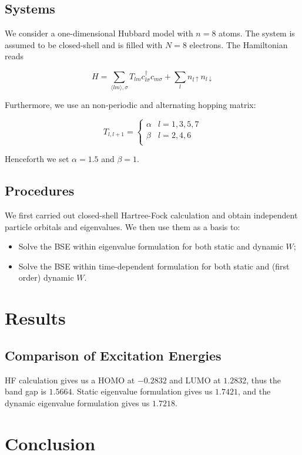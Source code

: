 \documentclass{article}
\begin{document}
\subsection{Systems}
We consider a one-dimensional Hubbard model with $n=8$ atoms. The system is assumed to be closed-shell and is filled with $N=8$ electrons. The Hamiltonian reads

$$
H=\sum_{\langle lm\rangle,\sigma}T_{lm}c_{l\sigma}^{\dagger}c_{m\sigma}+ \sum_{l}n_{l\uparrow}n_{l\downarrow}
$$

Furthermore, we use an non-periodic and alternating hopping matrix:

$$
T_{l,l+1}=
\begin{cases}
\alpha&l=1,3,5,7\\
\beta&l=2,4,6\\
\end{cases}
$$

Henceforth we set $\alpha=1.5$ and $\beta=1$.

\subsection{Procedures}
We first carried out closed-shell Hartree-Fock calculation and obtain independent particle orbitals and eigenvalues. We then use them as a basis to:

\begin{itemize}
    \item Solve the BSE within eigenvalue formulation for both static and dynamic $W$;
    \item Solve the BSE within time-dependent formulation for both static and (first order) dynamic $W$.
\end{itemize}

\section{Results}
\subsection{Comparison of Excitation Energies}
HF calculation gives us a HOMO at $-0.2832$ and LUMO at $1.2832$, thus the band gap is $1.5664$. Static eigenvalue formulation gives us $1.7421$, and the dynamic eigenvalue formulation gives us $1.7218$.
\section{Conclusion}
\end{document}
